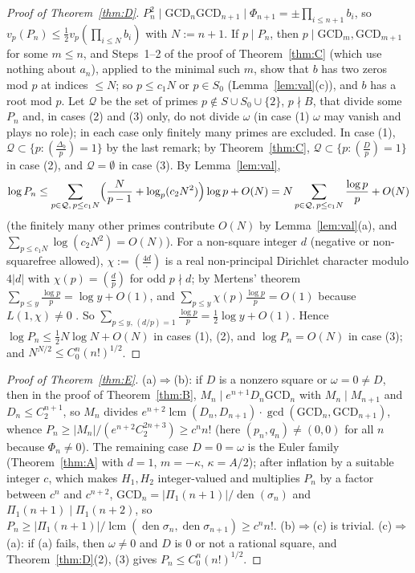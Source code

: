\documentclass[11pt]{amsart}
\theoremstyle{definition}
\theoremstyle{remark}
\numberwithin{equation}{section}
\newcommand{\GCD}{\mathrm{GCD}}
\newcommand{\den}{\operatorname{den}}
\newcommand{\lcm}{\operatorname{lcm}}
\begin{document}
\begin{proof}[Proof of Theorem~\ref{thm:D}]
$P_n^2\mid\GCD_n\GCD_{n+1}\mid\Phi_{n+1}=\pm\prod_{i\le n+1}b_i$, so $v_p(P_n)\le\frac12v_p(\prod_{i\le N}b_i)$ with $N:=n+1$. If $p\mid P_n$, then $p\mid\GCD_m,\GCD_{m+1}$ for some $m\le n$, and Steps~1--2 of the proof of Theorem~\ref{thm:C} (which use nothing about $a_n$), applied to the minimal such $m$, show that $b$ has two zeros mod $p$ at indices $\le N$; so $p\le c_1N$ or $p\in S_0$ (Lemma~\ref{lem:val}(c)), and $b$ has a root mod $p$. Let $\mathcal Q$ be the set of primes $p\notin S\cup S_0\cup\{2\}$, $p\nmid B$, that divide some $P_n$ and, in cases (2) and (3) only, do not divide $\omega$ (in case (1) $\omega$ may vanish and plays no role); in each case only finitely many primes are excluded. In case (1), $\mathcal Q\subset\{p:(\frac{\Delta_b}p)=1\}$ by the last remark; by Theorem~\ref{thm:C}, $\mathcal Q\subset\{p:(\frac Dp)=1\}$ in case (2), and $\mathcal Q=\emptyset$ in case (3). By Lemma~\ref{lem:val},
\[
\log P_n\le\sum_{p\in\mathcal Q,\,p\le c_1N}\Bigl(\frac N{p-1}+\log_p(c_2N^2)\Bigr)\log p+O(N)=N\sum_{p\in\mathcal Q,\,p\le c_1N}\frac{\log p}p+O(N)
\]
(the finitely many other primes contribute $O(N)$ by Lemma~\ref{lem:val}(a), and $\sum_{p\le c_1N}\log(c_2N^2)=O(N)$). For a non-square integer $d$ (negative or non-squarefree allowed), $\chi:=(\frac{4d}\cdot)$ is a real non-principal Dirichlet character modulo $4|d|$ with $\chi(p)=(\frac dp)$ for odd $p\nmid d$; by Mertens' theorem $\sum_{p\le y}\frac{\log p}p=\log y+O(1)$, and $\sum_{p\le y}\chi(p)\frac{\log p}p=O(1)$ because $L(1,\chi)\neq0$ \cite[ch.~4]{Dav80}. So $\sum_{p\le y,\,(d/p)=1}\frac{\log p}p=\frac12\log y+O(1)$. Hence $\log P_n\le\frac12N\log N+O(N)$ in cases (1), (2), and $\log P_n=O(N)$ in case (3); and $N^{N/2}\le C_0^n(n!)^{1/2}$.
\end{proof}

\begin{proof}[Proof of Theorem~\ref{thm:E}]
(a)$\Rightarrow$(b): if $D$ is a nonzero square or $\omega=0\neq D$, then in the proof of Theorem~\ref{thm:B}, $M_n\mid e^{n+1}D_n\GCD_n$ with $M_n\mid M_{n+1}$ and $D_n\le C_2^{n+1}$, so $M_n$ divides $e^{n+2}\lcm(D_n,D_{n+1})\cdot\gcd(\GCD_n,\GCD_{n+1})$, whence $P_n\ge|M_n|/(e^{n+2}C_2^{2n+3})\ge c^nn!$ (here $(p_n,q_n)\neq(0,0)$ for all $n$ because $\Phi_n\neq0$). The remaining case $D=0=\omega$ is the Euler family (Theorem~\ref{thm:A} with $d=1$, $m=-\kappa$, $\kappa=A/2$); after inflation by a suitable integer $c$, which makes $H_1,H_2$ integer-valued and multiplies $P_n$ by a factor between $c^n$ and $c^{n+2}$, $\GCD_n=|\Pi_1(n+1)|/\den(\sigma_n)$ and $\Pi_1(n+1)\mid\Pi_1(n+2)$, so $P_n\ge|\Pi_1(n+1)|/\lcm(\den\sigma_n,\den\sigma_{n+1})\ge c^nn!$. (b)$\Rightarrow$(c) is trivial. (c)$\Rightarrow$(a): if (a) fails, then $\omega\neq0$ and $D$ is $0$ or not a rational square, and Theorem~\ref{thm:D}(2), (3) gives $P_n\le C_0^n(n!)^{1/2}$.
\end{proof}
\end{document}
